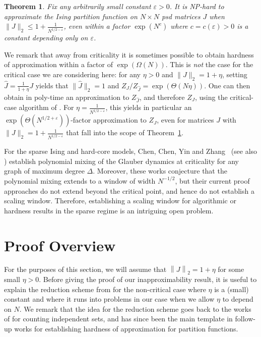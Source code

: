 \documentclass[11pt]{article}
\newtheorem{theorem}{Theorem}
\newcommand\norm[1]{\left\|{#1}\right\|}
\begin{document}
\begin{theorem}\label{thm:Ising}
Fix any arbitrarily small constant $\varepsilon>0$. 
It is NP-hard to approximate the Ising partition function on $N\times N$ psd matrices $J$ when $\|J\|_2 \leq  1 + \frac{1}{N^{1/2-\varepsilon}}$, even within a factor $\exp(N^c)$ where $c=c(\varepsilon)>0$ is a constant depending only on $\varepsilon$.
\end{theorem}

We remark that away from criticality it is sometimes possible to obtain hardness of approximation within a factor of $\exp(\Omega(N))$. This is \emph{not} the case for the critical case we are considering here: for any $\eta>0$ and $\|J\|_2 = 1 + \eta$, setting $\hat{J}=\tfrac{1}{1+\eta}J$ yields that $\|\hat{J}\|_2=1$ and $Z_J/Z_{\hat{J}}=\exp(\Theta(N\eta))$. One can then obtain in poly-time an approximation to $Z_{\hat{J}}$, and therefore $Z_J$, using the critical-case algorithm of \cite{CCYZ-critical-hard-core}. For $\eta=\tfrac{1}{N^{1/2-\varepsilon}}$, this yields in particular an $\exp(\Theta(N^{1/2+\varepsilon}))$-factor approximation to $Z_J$, even for matrices $J$ with $\|J\|_2 = 1 + \frac{1}{N^{1/2-\varepsilon}}$ that fall into the scope of Theorem~\ref{thm:Ising}.

For the sparse Ising and hard-core models, Chen, Chen, Yin and Zhang~\cite{CCYZ-critical-hard-core} (see also \cite{ChenJiang}) establish polynomial mixing of the Glauber dynamics at criticality for any graph of maximum degree $\Delta$.  Moreover, these works conjecture that the polynomial mixing extends to a window of width $N^{-1/2}$, but their current proof approaches do not extend beyond the critical point, and hence do not establish a scaling window.  Therefore, establishing a scaling window for algorithmic or hardness results in the sparse regime is an intriguing open problem.

\section{Proof Overview}
For the purposes of this section, we will assume that $\norm{J}_2=1+\eta$ for some small $\eta>0$. Before giving the proof of our inapproximability result, it is useful to explain the reduction scheme from \cite{Inapproxa} for the non-critical case where $\eta$ is a (small) constant and where it runs into problems in our case when we allow $\eta$ to depend on $N$. We remark that the idea for the reduction scheme goes back to the works of \cite{Dyer1,Sly2010, SlySun} for counting independent sets, and has since been the main template in follow-up works for establishing hardness of approximation for partition functions.
\end{document}
